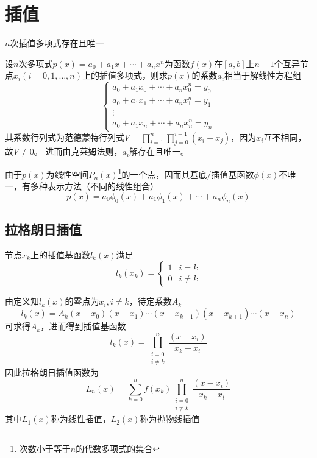 
\section{插值}
\begin{theorem}[唯一性]
$n$次插值多项式存在且唯一
\end{theorem}
\begin{analysis}
设$n$次多项式$p(x)=a_0+a_1x+\cdots+a_nx^n$为函数$f(x)$在$[a,b]$上$n+1$个互异节点$x_i(i=0,1,\ldots,n)$上的插值多项式，则求$p(x)$的系数$a_i$相当于解线性方程组
\[\begin{cases}
a_0+a_1x_0+\cdots+a_nx_0^n=y_0\\
a_0+a_1x_1+\cdots+a_nx_1^n=y_1\\
\vdots\\
a_0+a_1x_n+\cdots+a_nx_n^n=y_n
\end{cases}\]
其系数行列式为范德蒙特行列式$V=\prod_{i=1}^n\prod_{j=0}^{i-1}(x_i-x_j)$，因为$x_i$互不相同，故$V\ne 0$。
进而由克莱姆法则，$a_i$解存在且唯一。
\end{analysis}

由于$p(x)$为线性空间$P_n(x)$\footnote{次数小于等于$n$的代数多项式的集合}的一个点，因而其基底/插值基函数$\phi(x)$不唯一，有多种表示方法（不同的线性组合）
\[p(x)=a_0\phi_0(x)+a_1\phi_1(x)+\cdots+a_n\phi_n(x)\]

\subsection{拉格朗日插值}
\begin{definition}[拉格朗日插值基函数]
节点$x_k$上的插值基函数$l_k(x)$满足
\[l_k(x_k)=\begin{cases}1&i=k\\0&i\ne k\end{cases}\]
\end{definition}
\par 由定义知$l_k(x)$的零点为$x_i,i\ne k$，待定系数$A_k$
\[l_k(x)=A_k(x-x_0)(x-x_1)\cdots(x-x_{k-1})(x-x_{k+1})\cdots(x-x_n)\]
可求得$A_k$，进而得到插值基函数
\[l_k(x)=\prod_{\substack{i=0\\i\ne k}}^{n}\frac{(x-x_i)}{x_k-x_i}\]
因此拉格朗日插值函数为
\[L_n(x)=\sum_{k=0}^nf(x_k)\prod_{\substack{i=0\\i\ne k}}^{n}\frac{(x-x_i)}{x_k-x_i}\]
其中$L_1(x)$称为线性插值，$L_2(x)$称为抛物线插值


